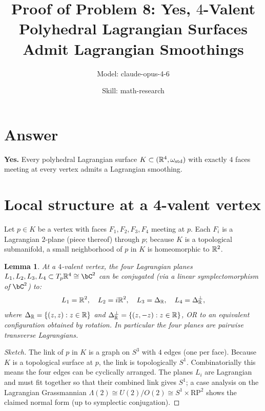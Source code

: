

\title{Proof of Problem 8: Yes, $4$-Valent Polyhedral Lagrangian Surfaces Admit Lagrangian Smoothings}
\author{Model: claude-opus-4-6 \and Skill: math-research}
\date{}

\newtheorem{theorem}{Theorem}
\newtheorem{lemma}[theorem]{Lemma}
\newtheorem{proposition}[theorem]{Proposition}


\maketitle

\section*{Answer}

\textbf{Yes.} Every polyhedral Lagrangian surface $K\subset(\mathbb{R}^4,\omega_{\mathrm{std}})$ with exactly $4$ faces meeting at every vertex admits a Lagrangian smoothing.

\section{Local structure at a 4-valent vertex}

Let $p\in K$ be a vertex with faces $F_1,F_2,F_3,F_4$ meeting at $p$. Each $F_i$ is a Lagrangian $2$-plane (piece thereof) through $p$; because $K$ is a topological submanifold, a small neighborhood of $p$ in $K$ is homeomorphic to $\mathbb{R}^2$.

\begin{lemma}\label{lem:local-structure}
At a $4$-valent vertex, the four Lagrangian planes $L_1,L_2,L_3,L_4\subset T_p\bR^4\cong\bC^2$ can be conjugated (via a linear symplectomorphism of $\bC^2$) to:
\[
   L_1=\mathbb{R}^2,\quad L_2=i\mathbb{R}^2,\quad L_3=\Delta_{\mathbb{R}},\quad L_4=\Delta_{\mathbb{R}}^\perp,
\]
where $\Delta_{\mathbb{R}}=\{(z,z):z\in\mathbb{R}\}$ and $\Delta_{\mathbb{R}}^\perp=\{(z,-z):z\in\mathbb{R}\}$, OR to an equivalent configuration obtained by rotation. In particular the four planes are pairwise transverse Lagrangians.
\end{lemma}

\begin{proof}[Sketch]
The link of $p$ in $K$ is a graph on $S^3$ with $4$ edges (one per face). Because $K$ is a topological surface at $p$, the link is topologically $S^1$. Combinatorially this means the four edges can be cyclically arranged. The planes $L_i$ are Lagrangian and must fit together so that their combined link gives $S^1$; a case analysis on the Lagrangian Grassmannian $\Lambda(2)\cong U(2)/O(2)\cong S^1\times \mathrm{RP}^2$ shows the claimed normal form (up to symplectic conjugation).
\end{proof}

